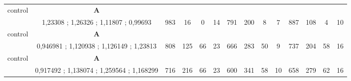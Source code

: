 \begin{table}[]
{\begin{tabular}{|c|c|c|c|c|c|c|c|c|c|c|c|c|c|}
control & \cellcolor{blue!15}\textbf{A}& {\color[HTML]{00009B} } & {\color[HTML]{9A0000} } & {\color[HTML]{009901} } &  & {\color[HTML]{00009B} } & {\color[HTML]{9A0000} } & {\color[HTML]{009901} } &  & {\color[HTML]{00009B} } & {\color[HTML]{9A0000} } & {\color[HTML]{009901} } &  \\ 
 & \cellcolor{ blue!15}1,23308 ; 1,26326 ; 1,11807 ; 0,99693 & \multirow{-2}{*}{{\color[HTML]{00009B} 983}} & \multirow{-2}{*}{{\color[HTML]{9A0000} 16}} & \multirow{-2}{*}{{\color[HTML]{009901} 0}} & \multirow{-2}{*}{14} & \multirow{-2}{*}{{\color[HTML]{00009B} 791}} & \multirow{-2}{*}{{\color[HTML]{9A0000} 200}} & \multirow{-2}{*}{{\color[HTML]{009901} 8}} & \multirow{-2}{*}{7} & \multirow{-2}{*}{{\color[HTML]{00009B} 887}} & \multirow{-2}{*}{{\color[HTML]{9A0000} 108}} & \multirow{-2}{*}{{\color[HTML]{009901} 4}} & \multirow{-2}{*}{10} \\ \hline

control & \cellcolor{blue!15}\textbf{A}& {\color[HTML]{00009B} } & {\color[HTML]{9A0000} } & {\color[HTML]{009901} } &  & {\color[HTML]{00009B} } & {\color[HTML]{9A0000} } & {\color[HTML]{009901} } &  & {\color[HTML]{00009B} } & {\color[HTML]{9A0000} } & {\color[HTML]{009901} } &  \\ 
 & \cellcolor{ blue!15}0,946981 ; 1,120938 ; 1,126149 ; 1,23813 & \multirow{-2}{*}{{\color[HTML]{00009B} 808}} & \multirow{-2}{*}{{\color[HTML]{9A0000} 125}} & \multirow{-2}{*}{{\color[HTML]{009901} 66}} & \multirow{-2}{*}{23} & \multirow{-2}{*}{{\color[HTML]{00009B} 666}} & \multirow{-2}{*}{{\color[HTML]{9A0000} 283}} & \multirow{-2}{*}{{\color[HTML]{009901} 50}} & \multirow{-2}{*}{9} & \multirow{-2}{*}{{\color[HTML]{00009B} 737}} & \multirow{-2}{*}{{\color[HTML]{9A0000} 204}} & \multirow{-2}{*}{{\color[HTML]{009901} 58}} & \multirow{-2}{*}{16} \\ \hline

control & \cellcolor{blue!15}\textbf{A}& {\color[HTML]{00009B} } & {\color[HTML]{9A0000} } & {\color[HTML]{009901} } &  & {\color[HTML]{00009B} } & {\color[HTML]{9A0000} } & {\color[HTML]{009901} } &  & {\color[HTML]{00009B} } & {\color[HTML]{9A0000} } & {\color[HTML]{009901} } &  \\ 
 & \cellcolor{ blue!15}0,917492 ; 1,138074 ; 1,259564 ; 1,168299 & \multirow{-2}{*}{{\color[HTML]{00009B} 716}} & \multirow{-2}{*}{{\color[HTML]{9A0000} 216}} & \multirow{-2}{*}{{\color[HTML]{009901} 66}} & \multirow{-2}{*}{23} & \multirow{-2}{*}{{\color[HTML]{00009B} 600}} & \multirow{-2}{*}{{\color[HTML]{9A0000} 341}} & \multirow{-2}{*}{{\color[HTML]{009901} 58}} & \multirow{-2}{*}{10} & \multirow{-2}{*}{{\color[HTML]{00009B} 658}} & \multirow{-2}{*}{{\color[HTML]{9A0000} 279}} & \multirow{-2}{*}{{\color[HTML]{009901} 62}} & \multirow{-2}{*}{16} \\ \hline



\end{tabular}}
\end{table}
